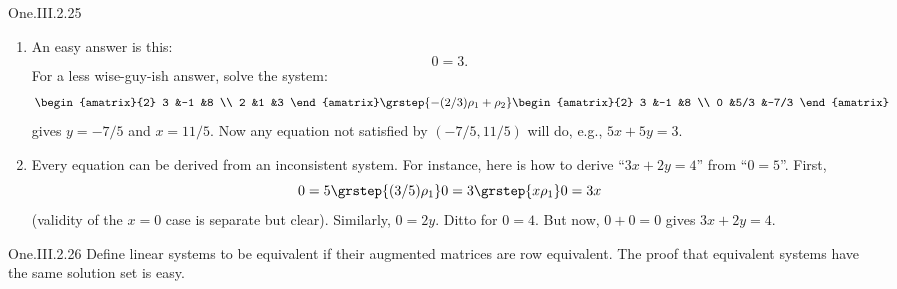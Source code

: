 \begin{ans}{One.III.2.25}
     \begin{enumerate}
        \item An easy answer is this:
          \begin{equation*}
            0=3.
          \end{equation*}
          For a less wise-guy-ish answer, solve the system:
          \begin{equation*}
            \begin{amatrix}{2}
              3  &-1  &8  \\
              2  &1   &3
            \end{amatrix}
            \grstep{-(2/3)\rho_1+\rho_2}
            \begin{amatrix}{2}
              3  &-1  &8    \\
              0  &5/3 &-7/3
            \end{amatrix}
          \end{equation*}
          gives \( y=-7/5 \) and \( x=11/5 \).
          Now any equation not satisfied by \( (-7/5,11/5) \) will do,
          e.g., \( 5x+5y=3 \).
        \item Every equation can be derived from an inconsistent system.
          For instance, here is how to derive ``\( 3x+2y=4 \)'' from
          ``\( 0=5 \)''.
          First,
          \begin{equation*}
            0=5
            \grstep{(3/5)\rho_1}
            0=3
            \grstep{x\rho_1}
            0=3x
          \end{equation*}
          (validity of the \( x=0 \) case is separate but clear).
          Similarly, \( 0=2y \).
          Ditto for \( 0=4 \).
          But now, \( 0+0=0 \) gives \( 3x+2y=4 \).
     \end{enumerate}
    
\end{ans}
\begin{ans}{One.III.2.26}
      Define linear systems to be equivalent if their augmented
      matrices are row equivalent.
      The proof that equivalent systems have the same solution set is easy.
    
\end{ans}
